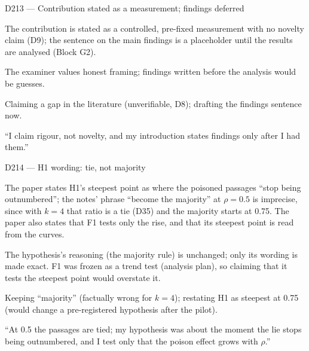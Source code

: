 \documentclass[11pt,a4paper]{report}
\begin{document}
\begin{decisionbox}{D213 --- Contribution stated as a measurement; findings deferred}
\begin{description}[nosep, leftmargin=0pt]
  \item[Decision.] The contribution is stated as a controlled, pre-fixed measurement with no novelty claim (D9); the sentence on the main findings is a placeholder until the results are analysed (Block G2).
  \item[Why.] The examiner values honest framing; findings written before the analysis would be guesses.
  \item[Alternatives.] Claiming a gap in the literature (unverifiable, D8); drafting the findings sentence now.
  \item[Interview line.] ``I claim rigour, not novelty, and my introduction states findings only after I had them.''
\end{description}
\end{decisionbox}

\begin{decisionbox}{D214 --- H1 wording: tie, not majority}
\begin{description}[nosep, leftmargin=0pt]
  \item[Decision.] The paper states H1's steepest point as where the poisoned passages ``stop being outnumbered''; the notes' phrase ``become the majority'' at $\rho=0.5$ is imprecise, since with $k=4$ that ratio is a tie (D35) and the majority starts at 0.75. The paper also states that F1 tests only the rise, and that its steepest point is read from the curves.
  \item[Why.] The hypothesis's reasoning (the majority rule) is unchanged; only its wording is made exact. F1 was frozen as a trend test (analysis plan), so claiming that it tests the steepest point would overstate it.
  \item[Alternatives.] Keeping ``majority'' (factually wrong for $k=4$); restating H1 as steepest at 0.75 (would change a pre-registered hypothesis after the pilot).
  \item[Interview line.] ``At 0.5 the passages are tied; my hypothesis was about the moment the lie stops being outnumbered, and I test only that the poison effect grows with $\rho$.''
\end{description}
\end{decisionbox}
\end{document}
